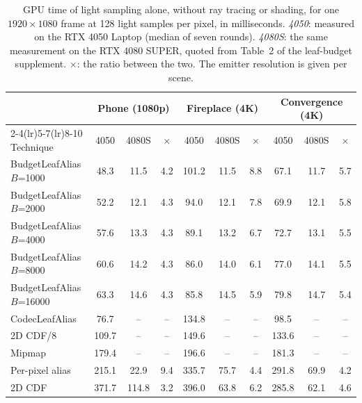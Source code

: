 \begin{table}[H]
\centering\small
\setlength{\tabcolsep}{4.5pt}
\caption{GPU time of light sampling alone, without ray tracing or shading, for one $1920\times1080$ frame at 128 light samples per pixel, in milliseconds. \emph{4050}: measured on the RTX 4050 Laptop (median of seven rounds). \emph{4080S}: the same measurement on the RTX 4080 SUPER, quoted from Table~2 of the leaf-budget supplement. $\times$: the ratio between the two. The emitter resolution is given per scene.}
\label{tab:cost}
\begin{tabular}{l ccc ccc ccc}
\toprule
 & \multicolumn{3}{c}{Phone (1080p)} & \multicolumn{3}{c}{Fireplace (4K)} & \multicolumn{3}{c}{Convergence (4K)} \\
\cmidrule(lr){2-4}\cmidrule(lr){5-7}\cmidrule(lr){8-10}
Technique & 4050 & 4080S & $\times$ & 4050 & 4080S & $\times$ & 4050 & 4080S & $\times$ \\
\midrule
BudgetLeafAlias $B$=1000 & 48.3 & 11.5 & 4.2 & 101.2 & 11.5 & 8.8 & 67.1 & 11.7 & 5.7 \\
BudgetLeafAlias $B$=2000 & 52.2 & 12.1 & 4.3 & 94.0 & 12.1 & 7.8 & 69.9 & 12.1 & 5.8 \\
BudgetLeafAlias $B$=4000 & 57.6 & 13.3 & 4.3 & 89.1 & 13.2 & 6.7 & 72.7 & 13.1 & 5.5 \\
BudgetLeafAlias $B$=8000 & 60.6 & 14.2 & 4.3 & 86.0 & 14.0 & 6.1 & 77.0 & 14.1 & 5.5 \\
BudgetLeafAlias $B$=16000 & 63.3 & 14.6 & 4.3 & 85.8 & 14.5 & 5.9 & 79.8 & 14.7 & 5.4 \\
CodecLeafAlias & 76.7 & -- & -- & 134.8 & -- & -- & 98.5 & -- & -- \\
2D CDF/8 & 109.7 & -- & -- & 149.6 & -- & -- & 133.6 & -- & -- \\
Mipmap & 179.4 & -- & -- & 196.6 & -- & -- & 181.3 & -- & -- \\
Per-pixel alias & 215.1 & 22.9 & 9.4 & 335.7 & 75.7 & 4.4 & 291.8 & 69.9 & 4.2 \\
2D CDF & 371.7 & 114.8 & 3.2 & 396.0 & 63.8 & 6.2 & 285.8 & 62.1 & 4.6 \\
\bottomrule
\end{tabular}
\end{table}
